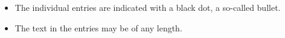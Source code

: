 \begin{itemize} \itemsep0em
  \item The individual entries are indicated with a black dot, a so-called bullet.
  \item The text in the entries may be of any length.
\end{itemize}
